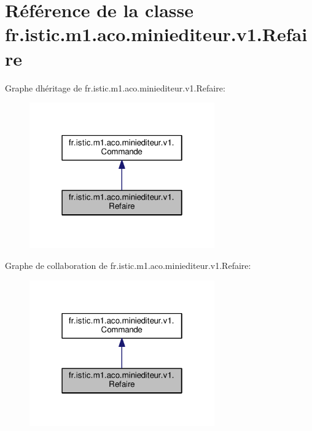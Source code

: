 \hypertarget{classfr_1_1istic_1_1m1_1_1aco_1_1miniediteur_1_1v1_1_1Refaire}{}\section{Référence de la classe fr.\+istic.\+m1.\+aco.\+miniediteur.\+v1.\+Refaire}
\label{classfr_1_1istic_1_1m1_1_1aco_1_1miniediteur_1_1v1_1_1Refaire}


Graphe d\textquotesingle{}héritage de fr.\+istic.\+m1.\+aco.\+miniediteur.\+v1.\+Refaire\+:\nopagebreak
\begin{figure}[H]
\begin{center}
\leavevmode
\includegraphics[width=226pt]{classfr_1_1istic_1_1m1_1_1aco_1_1miniediteur_1_1v1_1_1Refaire__inherit__graph}
\end{center}
\end{figure}


Graphe de collaboration de fr.\+istic.\+m1.\+aco.\+miniediteur.\+v1.\+Refaire\+:\nopagebreak
\begin{figure}[H]
\begin{center}
\leavevmode
\includegraphics[width=226pt]{classfr_1_1istic_1_1m1_1_1aco_1_1miniediteur_1_1v1_1_1Refaire__coll__graph}
\end{center}
\end{figure}
